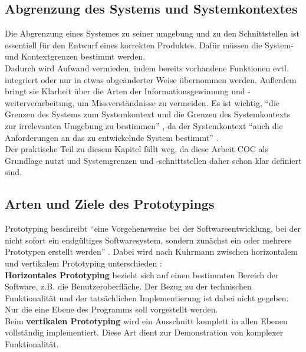 \documentclass [12pt, a4paper, oneside, titlepage, ngerman]{article}
\begin{document}
\subsection{Abgrenzung des Systems und Systemkontextes}
Die Abgrenzung eines Systemes zu seiner umgebung und zu den Schnittstellen ist essentiell für den Entwurf eines korrekten Produktes. Dafür müssen die System- und Kontextgrenzen bestimmt werden. \\
Dadurch wird Aufwand vermieden, indem bereits vorhandene Funktionen evtl. integriert oder nur in etwas abgeänderter Weise übernommen werden. Außerdem bringt sie Klarheit über die Arten der Informationsgewinnung und -weiterverarbeitung, um Missverständnisse zu vermeiden. Es ist wichtig, "`die Grenzen des Systems zum Systemkontext und die Grenzen des Systemkontexts zur irrelevanten Umgebung zu bestimmen"' \cite[S.20]{PohlRupp2015}, da der Systemkontext "`auch die Anforderungen an das zu entwickelnde System bestimmt"' \cite[S.20]{PohlRupp2015}. \\
Der praktische Teil zu diesem Kapitel fällt weg, da diese Arbeit \ac{COC} als Grundlage nutzt und Systemgrenzen und -schnittstellen daher schon klar definiert sind. 

\subsection{Arten und Ziele des Prototypings}
Prototyping beschreibt "`eine Vorgehensweise bei der Softwareentwicklung, bei der nicht sofort ein endgültiges Softwaresystem, sondern zunächst ein oder mehrere Prototypen erstellt werden"' \cite[S.152]{gabler}. Dabei wird nach Kuhrmann zwischen horizontalem und vertikalem Prototyping unterschieden \cite[vgl.][]{Kuhrmann2012}: \\ 
\textbf{Horizontales Prototyping} bezieht sich auf einen bestimmten Bereich der Software, z.B. die Benutzeroberfläche. Der Bezug zu der technischen Funktionalität und der tatsächlichen Implementierung ist dabei nicht gegeben. Nur die eine Ebene des Programms soll vorgestellt werden.\\
Beim \textbf{vertikalen Prototyping} wird ein Ausschnitt komplett in allen Ebenen vollständig implementiert. Diese Art dient zur Demonstration von komplexer Funktionalität.\\
\end{document}
